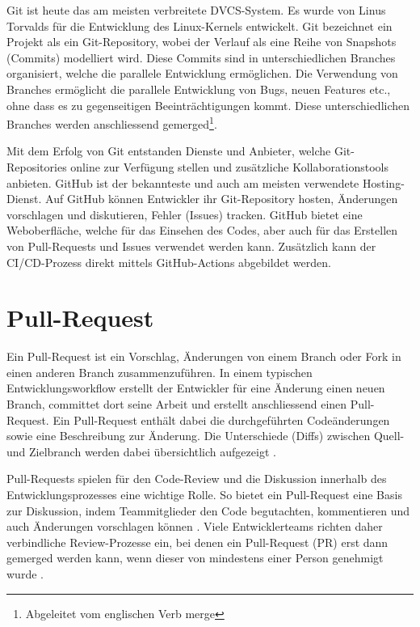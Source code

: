 Git ist heute das am meisten verbreitete DVCS-System. Es wurde von Linus Torvalds für die Entwicklung des Linux-Kernels entwickelt. \parencite{zack_git_2018} Git bezeichnet ein Projekt als ein Git-Repository, wobei der Verlauf als eine Reihe von Snapshots (Commits) modelliert wird. Diese Commits sind in unterschiedlichen Branches organisiert, welche die parallele Entwicklung ermöglichen. Die Verwendung von Branches ermöglicht die parallele Entwicklung von Bugs, neuen Features etc., ohne dass es zu gegenseitigen Beeinträchtigungen kommt. Diese unterschiedlichen Branches werden anschliessend gemerged\footnote{Abgeleitet vom englischen Verb merge}. \parencite{noauthor_informationen_2025}   

Mit dem Erfolg von Git entstanden Dienste und Anbieter, welche Git-Repositories online zur Verfügung stellen und zusätzliche Kollaborationstools anbieten. GitHub ist der bekannteste und auch am meisten verwendete Hosting-Dienst. Auf GitHub können Entwickler ihr Git-Repository hosten, Änderungen vorschlagen und diskutieren, Fehler (Issues) tracken. GitHub bietet eine Weboberfläche, welche für das Einsehen des Codes, aber auch für das Erstellen von Pull-Requests und Issues verwendet werden kann. Zusätzlich kann der CI/CD-Prozess direkt mittels GitHub-Actions abgebildet werden. \parencite{noauthor_informationen_2025}  

\section{Pull-Request} 
Ein Pull-Request ist ein Vorschlag, Änderungen von einem Branch oder Fork in einen anderen Branch zusammenzuführen. In einem typischen Entwicklungsworkflow erstellt der Entwickler für eine Änderung einen neuen Branch, committet dort seine Arbeit und erstellt anschliessend einen Pull-Request. Ein Pull-Request enthält dabei die durchgeführten Codeänderungen sowie eine Beschreibung zur Änderung. Die Unterschiede (Diffs) zwischen Quell- und Zielbranch werden dabei übersichtlich aufgezeigt \parencite{noauthor_about_nodate}.

Pull-Requests spielen für den Code-Review und die Diskussion innerhalb des Entwicklungsprozesses eine wichtige Rolle. So bietet ein Pull-Request eine Basis zur Diskussion, indem Teammitglieder den Code begutachten, kommentieren und auch Änderungen vorschlagen können \parencite{atlassian_pull_nodate}. Viele Entwicklerteams richten daher verbindliche Review-Prozesse ein, bei denen ein Pull-Request (PR) erst dann gemerged werden kann, wenn dieser von mindestens einer Person genehmigt wurde \parencite{jiang_how_2022}.

